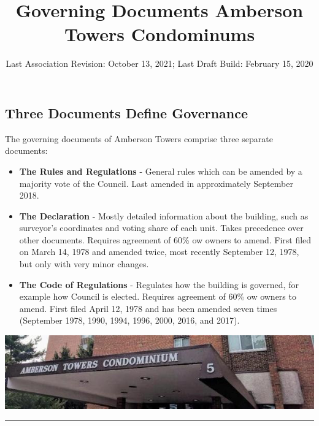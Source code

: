 \documentclass[
  14pt,
]{book}
\title{Governing Documents Amberson Towers Condominums}
\author{}
\date{\vspace{-2.5em}Last Association Revision: October 13, 2021; Last Draft Build: February 15, 2020}
\begin{document}
\maketitle

{
\setcounter{tocdepth}{1}
\tableofcontents
}
\hypertarget{section}{%
\chapter*{}\label{section}}

\hypertarget{three-documents-define-governance}{%
\section*{Three Documents Define Governance}\label{three-documents-define-governance}}

The governing documents of Amberson Towers comprise three separate documents:

\begin{itemize}
\item
  \textbf{The Rules and Regulations} - General rules which can be amended by a majority vote of the Council. Last amended in approximately September 2018.
\item
  \textbf{The Declaration} - Mostly detailed information about the building, such as surveyor's coordinates and voting share of each unit. Takes precedence over other documents. Requires agreement of 60\% ow owners to amend. First filed on March 14, 1978 and amended twice, most recently September 12, 1978, but only with very minor changes.
\item
  \textbf{The Code of Regulations} - Regulates how the building is governed, for example how Council is elected. Requires agreement of 60\% ow owners to amend. First filed April 12, 1978 and has been amended seven times (September 1978, 1990, 1994, 1996, 2000, 2016, and 2017).
\end{itemize}

\includegraphics{amber3.jpg}

\begin{center}\rule{0.5\linewidth}{0.5pt}\end{center}
\end{document}
